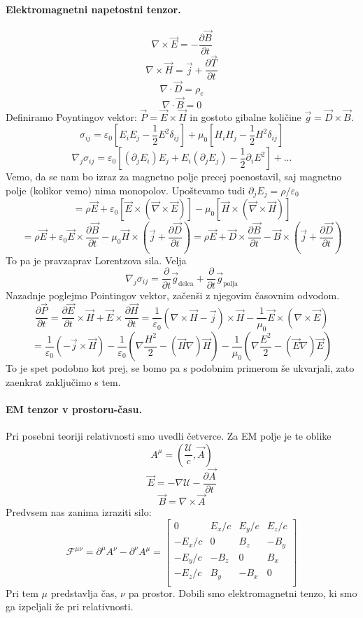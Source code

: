 \documentclass[a4paper]{article}
\newcommand{\vct}[1]{\overrightarrow{#1}}
\newcommand{\pd}[2]{\frac{\partial {#1}}{\partial {#2}}}
\begin{document}
\paragraph{Elektromagnetni napetostni tenzor.} $$\nabla \times \vct{E} = -\pd{\vct{B}}{t}$$
$$\nabla \times \vct{H} = \vct{j} + \pd{\vct{T}}{t}$$
$$\nabla\cdot\vct{D} = \rho_e$$
$$\nabla\cdot\vct{B} = 0$$
Definiramo Poyntingov vektor: $\vct{P} = \vct{E} \times \vct{H}$ in gostoto gibalne količine $\vct{g} = \vct{D} \times \vct{B}$.
$$\sigma_{ij} = \varepsilon_0\left[E_iE_j-\frac{1}{2}E^2\delta_{ij}\right] + \mu_0\left[H_iH_j-\frac{1}{2}H^2\delta_{ij}\right]$$
$$\nabla_j\sigma_{ij} = \varepsilon_0\left[(\partial_jE_i)E_j + E_i(\partial_jE_j) - \frac{1}{2}\partial_iE^2\right] + ...$$
Vemo, da se nam bo izraz za magnetno polje precej poenostavil, saj magnetno polje (kolikor vemo) nima monopolov. Upoštevamo tudi $\partial_jE_j = \rho/\varepsilon_0$
$$= \rho \vct{E} + \varepsilon_0\left[\vct{E} \times (\vct{\nabla}\times\vct{E}) \right] - \mu_0\left[\vct{H}\times(\vct{\nabla}\times\vct{H})\right]$$
$$=\rho\vct{E} + \varepsilon_0\vct{E}\times\pd{\vct{B}}{t} - \mu_0\vct{H}\times\left(\vct{j} + \pd{\vct{D}}{t}\right) = \rho\vct{E} + \vct{D}\times\pd{\vct{B}}{t} - \vct{B}\times\left(\vct{j} + \pd{\vct{D}}{t}\right)$$
To pa je pravzaprav Lorentzova sila. Velja $$\nabla_j\sigma_{ij} = \pd{}{t}\vct{g}_{\text{delca}} + \pd{}{t}\vct{g}_{\text{polja}}$$
Nazadnje poglejmo Pointingov vektor, začenši z njegovim časovnim odvodom.
$$\pd{\vct{P}}{t} = \pd{\vct{E}}{t} \times \vct{H} + \vct{E} \times \pd{\vct{H}}{t} = \frac{1}{\varepsilon_0}\left(\nabla\times\vct{H}-\vct{j}\right)\times\vct{H}-\frac{1}{\mu_0}\vct{E}\times\left(\nabla\times\vct{E}\right)$$
$$= \frac{1}{\varepsilon_0} \left(-\vct{j}\times\vct{H}\right) - \frac{1}{\varepsilon_0}\left(\nabla\frac{H^2}{2} - (\vct{H}\nabla)\vct{H}\right) - \frac{1}{\mu_0}\left(\nabla\frac{E^2}{2}-(\vct{E}\nabla)\vct{E}\right)$$
To je spet podobno kot prej, se bomo pa s podobnim primerom še ukvarjali, zato zaenkrat zaključimo s tem.
\paragraph{EM tenzor v prostoru-času.} Pri posebni teoriji relativnosti smo uvedli četverce. Za EM polje je te oblike
$$A^{\mu} = \left(\frac{\mathcal{U}}{c}, \vct{A}\right)$$
$$\vct{E} = -\nabla \mathcal{U} - \pd{\vct{A}}{t}$$
$$\vct{B} = \nabla \times \vct{A}$$
Predvsem nas zanima izraziti silo:
$$\mathcal{F}^{\mu\nu} = \partial^{\mu}A^{\nu} - \partial^\nu A^\mu = \begin{bmatrix}
    0 & E_x/c & E_y/c & E_z/c \\
    -E_x/c & 0 & B_z & -B_y \\
    -E_y/c & -B_z & 0 & B_x \\
    -E_z/c & B_y & -B_x & 0 \\
\end{bmatrix}$$
Pri tem $\mu$ predstavlja čas, $\nu$ pa prostor. Dobili smo elektromagnetni tenzo, ki smo ga izpeljali že pri relativnosti.
\end{document}
